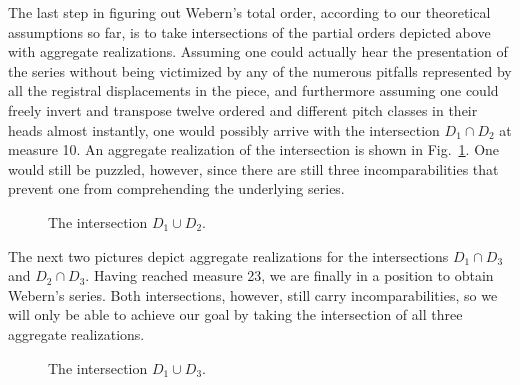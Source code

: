 \begin{example}
	\noindent The last step in figuring out Webern's total order, according to our theoretical assumptions so far, is to take intersections of the partial orders depicted above with aggregate realizations. Assuming one could actually hear the presentation of the series without being victimized by any of the numerous pitfalls represented by all the registral displacements in the piece, and furthermore assuming one could freely invert and transpose twelve ordered and different pitch classes in their heads almost instantly, one would possibly arrive with the intersection $D_1 \cap D_2$ at measure 10. An aggregate realization of the intersection is shown in Fig.~\ref{fig:webern-aggregate-e}. One would still be puzzled, however, since there are still three incomparabilities that prevent one from comprehending the underlying series.

	\begin{figure}[htbp]
    	\centering
		\caption[Intersecting Bars 1--7 with Bars 8--10 in Webern's Op.~27]{The intersection $D_1 \cup D_2$.}
    	\label{fig:webern-aggregate-e}
	\end{figure}

	\noindent The next two pictures depict aggregate realizations for the intersections $D_1 \cap D_3$ and $D_2 \cap D_3$. Having reached measure 23, we are finally in a position to obtain Webern's series. Both intersections, however, still carry incomparabilities, so we will only be able to achieve our goal by taking the intersection of all three aggregate realizations.

	\begin{figure}[htbp]
    	\centering
		\caption[Intersecting Bars 1--7 with Bars 19--23 in Webern's Op.~27]{The intersection $D_1 \cup D_3$.}
    	\label{fig:webern-aggregate-f}
	\end{figure}


\end{example}
